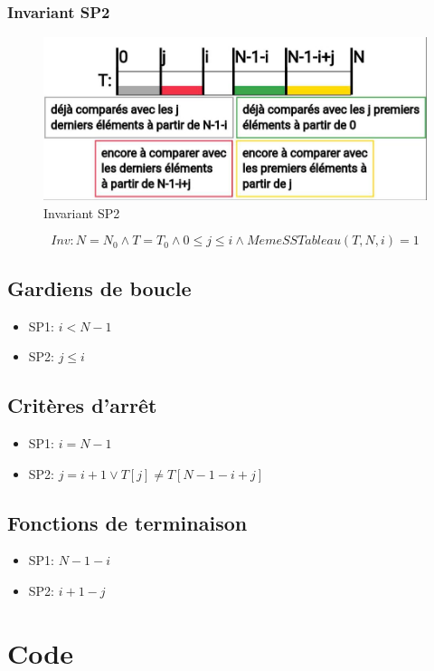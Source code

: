 \documentclass[a4paper, 11pt, oneside]{article}
\begin{document}
\subsubsection{Invariant SP2}
\begin{figure}[h]
  \centering
  \includegraphics[scale=0.4]{invariant_sp2.jpg}
  \caption{Invariant SP2}
\end{figure}

$$Inv: N=N_0\wedge T=T_0\wedge 0\leq j \leq i\wedge MemeSSTableau(T,N,i)=1$$
\subsection{Gardiens de boucle}
\begin{itemize}
  \item SP1: $i<N-1$
  \item SP2: $j\leq i$
\end{itemize}
\subsection{Critères d'arrêt}
\begin{itemize}
  \item SP1: $i=N-1$
  \item SP2: $j=i+1 \vee T[j]\neq T[N-1-i+j]$
\end{itemize}
\subsection{Fonctions de terminaison}
\begin{itemize}
  \item SP1: $N-1-i$
  \item SP2: $i+1-j$
\end{itemize}

\section{Code}
\end{document}
